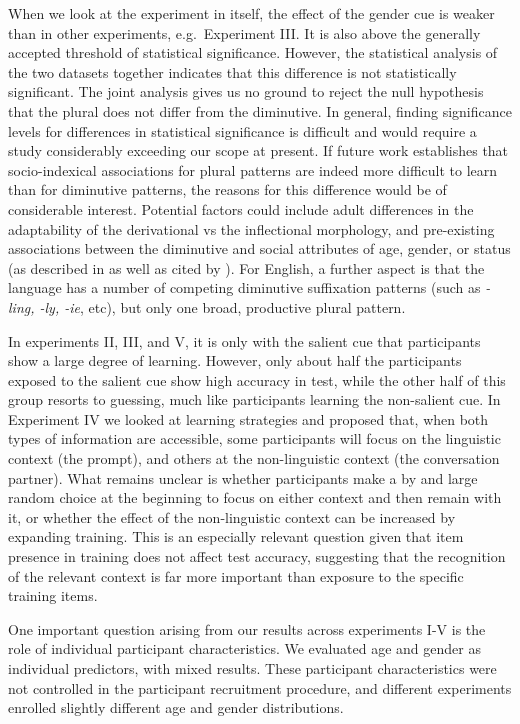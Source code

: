 \documentclass{frontiersSCNS} %
\begin{document}
When we look at the experiment in itself, the effect of the gender cue is weaker than in other experiments, e.g.\  Experiment III. It is also above the generally accepted threshold of statistical significance. However, the statistical analysis of the two datasets together indicates that this difference is not statistically significant. The joint analysis gives us no ground to reject the null hypothesis that the plural does not differ from the diminutive. In general, finding significance levels for differences in statistical significance is difficult and would require a study considerably exceeding our scope at present.  If future work establishes that socio-indexical associations for plural patterns are indeed more difficult to learn than for  diminutive patterns, the reasons for this difference would be of considerable interest. Potential factors could include adult differences in the adaptability of the derivational vs the inflectional morphology, and  pre-existing associations between the diminutive and social attributes of age, gender, or status (as described in \citealt{jurafsky2012universals} as well as \citealt{kruisinga1942diminutieve} cited by \citealt{bauer1997evaluative}). For English, a further aspect is that the language has a number of competing diminutive suffixation patterns (such as {\it -ling, -ly, -ie}, etc), but only one broad, productive plural pattern.  


In experiments II, III, and V, it is only with the salient cue that participants show a large degree of learning. However, only about half the participants exposed to the salient cue show high accuracy in test, while the other half of this group resorts to guessing, much like participants learning the non-salient cue. In Experiment IV we looked at learning strategies and proposed that, when both types of information are accessible, some participants will focus on the linguistic context (the prompt), and others at the non-linguistic context (the conversation partner). What remains unclear is whether participants make a by and large random choice at the beginning to focus on either context and then remain with it, or whether the effect of the non-linguistic context can be increased by expanding training. This is an especially relevant question given that item presence in training does not affect test accuracy, suggesting that the recognition of the relevant context is far more important than exposure to the specific training items.


One important question arising from our results across experiments I-V is the role of individual participant characteristics.   We evaluated age and gender as individual predictors, with mixed results. These participant characteristics were not controlled in the participant recruitment procedure, and different experiments enrolled slightly different age and gender distributions.
\end{document}
